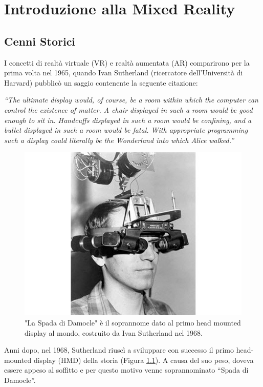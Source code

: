 \chapter{Introduzione alla Mixed Reality}

\section{Cenni Storici}\label{sec:Sezione1.1}
I concetti di realtà virtuale (VR) e realtà aumentata (AR) comparirono per la prima volta nel 1965, quando Ivan Sutherland (ricercatore dell’Università di Harvard) pubblicò un saggio \cite{theultimatedisplay} contenente la seguente citazione:
\begin{center}
\textit{“The ultimate display would, of course, be a room within which the computer can control the existence of matter. A chair displayed in such a room would be good enough to sit in. Handcuffs displayed in such a room would be confining, and a bullet displayed in such a room would be fatal. With appropriate programming such a display could literally be the Wonderland into which Alice walked.”} 
\end{center}

\begin{figure}[t]
    \centering
    \includegraphics[width=\textwidth]{images/sword-of-damocles-vr.jpg}
    \caption{"La Spada di Damocle" è il soprannome dato al primo head mounted display al mondo, costruito da Ivan Sutherland nel 1968.}
    \label{fig:figure1}
\end{figure}

Anni dopo, nel 1968, Sutherland riuscì a sviluppare con successo il primo head-mounted display (HMD) della storia (Figura \ref{fig:figure1}). A causa del suo peso, doveva essere appeso al soffitto e per questo motivo venne soprannominato “Spada di Damocle”.

